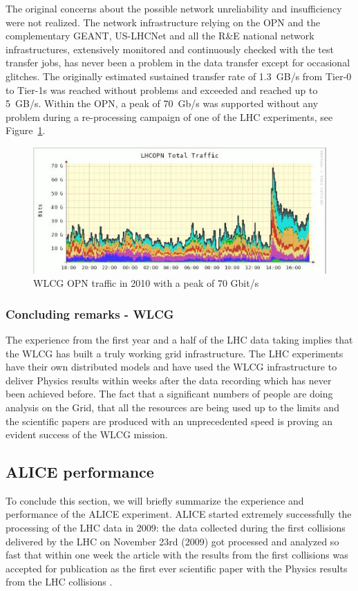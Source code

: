 The original concerns about the possible network unreliability and
insufficiency were not realized. The network infrastructure relying
on the OPN and the complementary GEANT, US-LHCNet and all the R\&E
national network infrastructures, extensively monitored and
continuously checked with the test transfer jobs, has never been a
problem in the data transfer except for occasional glitches. The
originally estimated sustained transfer rate of 1.3~GB/s from Tier-0
to Tier-1s was reached without problems and exceeded and reached up
to 5~GB/s. Within the OPN, a peak of 70~Gb/s was supported without
any problem during a re-processing campaign of one of the LHC
experiments, see Figure~\ref{fig20}.

\begin{figure}[htb] %
\centering
\includegraphics[width=13cm]{fig20.eps} %
\caption{WLCG OPN traffic in 2010 with a peak of 70
Gbit/s}\label{fig20}
\end{figure}



\subsubsection{Concluding remarks - WLCG}
%
The experience from the first year and a half of the LHC data taking
implies that the WLCG has built a truly working grid infrastructure.
The LHC experiments have their own distributed models and have used
the WLCG infrastructure to deliver Physics results within weeks
after the data recording which has never been achieved before. The
fact that a significant numbers of people are doing analysis on the
Grid, that all the resources are being used up to the limits and the
scientific papers are produced with an unprecedented speed is
proving an evident success of the WLCG mission.


\subsection{ALICE performance}
%
To conclude this section, we will briefly summarize the experience
and performance of the ALICE experiment. ALICE started extremely
successfully the processing of the LHC data in 2009: the data
collected during the first collisions delivered by the LHC on
November 23rd (2009) got processed and analyzed so fast that within
one week the article with the results from the first collisions was
accepted for publication as the first ever scientific paper with the
Physics results from the LHC collisions \cite{ALICE_pp}.

